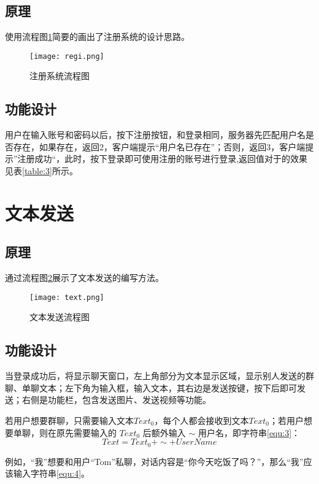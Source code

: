 \documentclass[forprint]{OSPaper}
\begin{document}
\subsection{原理}
使用流程图\ref{fig:9}简要的画出了注册系统的设计思路。
\begin{figure}[ht]
	\centering
	\texttt{[image: regi.png]}
	\caption{注册系统流程图}
	\label{fig:9}
\end{figure}

\subsection{功能设计}

用户在输入账号和密码以后，按下注册按钮，和登录相同，服务器先匹配用户名是否存在，如果存在，返回2，客户端提示“用户名已存在”；否则，返回3，客户端提示”注册成功“，此时，按下登录即可使用注册的账号进行登录,返回值对于的效果见表\ref{table:3}所示。

\section{文本发送}
\subsection{原理}
通过流程图\ref{fig:10}展示了文本发送的编写方法。
\begin{figure}[ht]
	\centering
	\texttt{[image: text.png]}
	\caption{文本发送流程图}
	\label{fig:10}
\end{figure}

\subsection{功能设计}

当登录成功后，将显示聊天窗口，左上角部分为文本显示区域，显示别人发送的群聊、单聊文本；左下角为输入框，输入文本，其右边是发送按键，按下后即可发送；右侧是功能栏，包含发送图片、发送视频等功能。

若用户想要群聊，只需要输入文本$Text_0$，每个人都会接收到文本$Text_0$；若用户想要单聊，则在原先需要输入的 $Text_0$ 后额外输入 $ \sim $  用户名，即字符串\ref{equ:3}：
\begin{equation}
	\label{equ:3}
	Text = Text_0 + \sim + UserName
\end{equation} 

例如，“我”想要和用户“Tom”私聊，对话内容是“你今天吃饭了吗？”，那么“我”应该输入字符串\ref{equ:4}。
\end{document}
